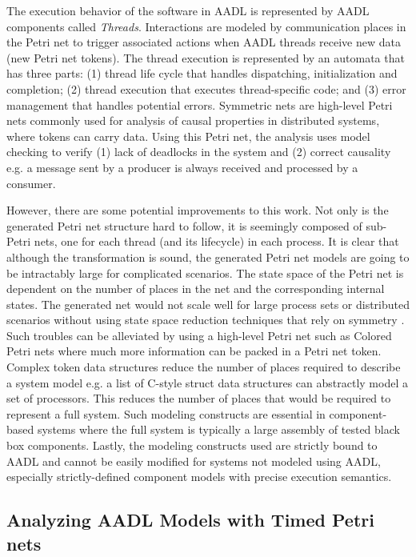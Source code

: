 The execution behavior of the software in AADL is represented by AADL components called \emph{Threads}. Interactions are modeled by communication places in the Petri net to trigger associated actions when AADL threads receive new data (new Petri net tokens). The thread execution is represented by an automata that has three parts: (1) thread life cycle that handles dispatching, initialization and completion; (2) thread execution that executes thread-specific code; and (3) error management that handles potential errors. Symmetric nets are high-level Petri nets commonly used for analysis of causal properties in distributed systems, where tokens can carry data. Using this Petri net, the analysis uses model checking to verify (1) lack of deadlocks in the system and (2) correct causality e.g. a message sent by a producer is always received and processed by a consumer. 

However, there are some potential improvements to this work. Not only is the generated Petri net structure hard to follow, it is seemingly composed of sub-Petri nets, one for each thread (and its lifecycle) in each process. It is clear that although the transformation is sound, the generated Petri net models are going to be intractably large for complicated scenarios. The state space of the Petri net is dependent on the number of places in the net and the corresponding internal states. The generated net would not scale well for large process sets or distributed scenarios without using state space reduction techniques that rely on symmetry \cite{sistla2004symmetry}. Such troubles can be alleviated by using a high-level Petri net such as Colored Petri nets where much more information can be packed in a Petri net token. Complex token data structures reduce the number of places required to describe a system model e.g. a list of C-style struct data structures can abstractly model a set of processors. This reduces the number of places that would be required to represent a full system. Such modeling constructs are essential in component-based systems where the full system is typically a large assembly of tested black box components. Lastly, the modeling constructs used are strictly bound to AADL and cannot be easily modified for systems not modeled using AADL, especially strictly-defined component models with precise execution semantics. 

\subsection{Analyzing AADL Models with Timed Petri nets}

